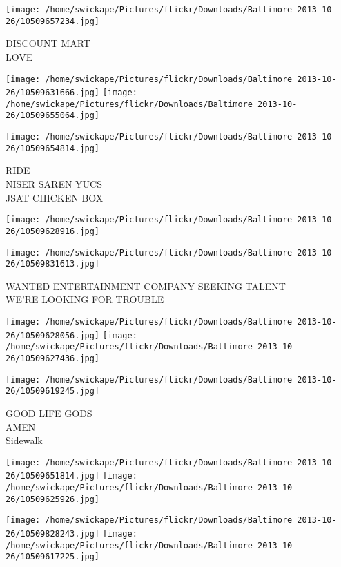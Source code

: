 \documentclass[10pt,letterpaper]{article}
\begin{document}
\vspace{0.25in}
\texttt{[image: /home/swickape/Pictures/flickr/Downloads/Baltimore 2013-10-26/10509657234.jpg]}

DISCOUNT MART\\
LOVE\\
\pagebreak

\texttt{[image: /home/swickape/Pictures/flickr/Downloads/Baltimore 2013-10-26/10509631666.jpg]}
\texttt{[image: /home/swickape/Pictures/flickr/Downloads/Baltimore 2013-10-26/10509655064.jpg]}

\texttt{[image: /home/swickape/Pictures/flickr/Downloads/Baltimore 2013-10-26/10509654814.jpg]}

RIDE\\
NISER SAREN YUCS\\
JSAT CHICKEN BOX\\
\pagebreak

\texttt{[image: /home/swickape/Pictures/flickr/Downloads/Baltimore 2013-10-26/10509628916.jpg]}

\vspace{0.25in}
\texttt{[image: /home/swickape/Pictures/flickr/Downloads/Baltimore 2013-10-26/10509831613.jpg]}

WANTED ENTERTAINMENT COMPANY SEEKING TALENT\\
WE'RE LOOKING FOR TROUBLE\\
\pagebreak

\texttt{[image: /home/swickape/Pictures/flickr/Downloads/Baltimore 2013-10-26/10509628056.jpg]}
\texttt{[image: /home/swickape/Pictures/flickr/Downloads/Baltimore 2013-10-26/10509627436.jpg]}

\vspace{0.25in}
\texttt{[image: /home/swickape/Pictures/flickr/Downloads/Baltimore 2013-10-26/10509619245.jpg]}

GOOD LIFE GODS\\
AMEN\\
Sidewalk\\
\pagebreak

\texttt{[image: /home/swickape/Pictures/flickr/Downloads/Baltimore 2013-10-26/10509651814.jpg]}
\texttt{[image: /home/swickape/Pictures/flickr/Downloads/Baltimore 2013-10-26/10509625926.jpg]}

\texttt{[image: /home/swickape/Pictures/flickr/Downloads/Baltimore 2013-10-26/10509828243.jpg]}
\texttt{[image: /home/swickape/Pictures/flickr/Downloads/Baltimore 2013-10-26/10509617225.jpg]}
\end{document}
